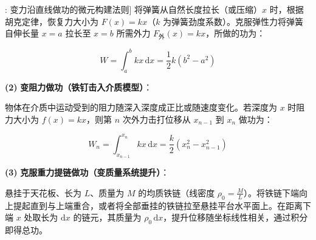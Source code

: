 \documentclass[11pt,a4paper,UTF8]{ctexart}
\begin{document}
\begin{thmbox}[方法[1]: 变力沿直线做功的微元构建法则]
将弹簧从自然长度拉长（或压缩）$x$ 时，根据胡克定律，恢复力大小为 $F(x) = kx$（$k$ 为弹簧劲度系数）。克服弹性力将弹簧自伸长量 $x = a$ 拉长至 $x = b$ 所需外力 $F_{\text{外}}(x) = kx$，所做的功为：


\begin{equation*}
W = \int_a^b kx\,\mathrm{d}x = \frac{1}{2}k(b^2 - a^2)
\end{equation*}


\textbf{(2)}  \textbf{变阻力做功（铁钉击入介质模型）}：

物体在介质中运动受到的阻力随深入深度成正比或随速度变化。若深度为 $x$ 时阻力大小为 $f(x) = kx$，则第 $n$ 次外力击打位移从 $x_{n-1}$ 到 $x_n$ 做功为：


\begin{equation*}
W_n = \int_{x_{n-1}}^{x_n} kx\,\mathrm{d}x = \frac{k}{2}(x_n^2 - x_{n-1}^2)
\end{equation*}


\textbf{(3)}  \textbf{克服重力提链做功（变质量系统提升）}：

悬挂于天花板、长为 $L$、质量为 $M$ 的均质铁链（线密度 $\rho_0 = \frac{M}{L}$）。将铁链下端向上提起直到与上端重合，或者将全部垂挂的铁链拉至悬挂平台水平面上。在距离下端 $x$ 处取长为 $\mathrm{d}x$ 的链元，其质量为 $\rho_0\,\mathrm{d}x$，提升位移随坐标线性相关，通过积分即得总功。

\end{thmbox}
\end{document}
